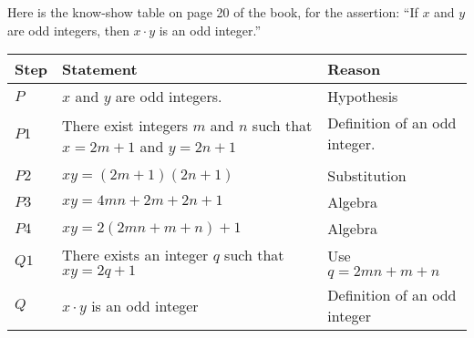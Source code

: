 \documentclass[12pt]{article}
\begin{document}
Here is the know-show table on page 20 of the book, for the assertion:
``If $x$ and $y$ are odd integers, then $x\cdot y$ is an odd integer.''\medskip

\begin{tabular}{|l|l|l|}\hline   %
  {\bf Step } & {\bf Statement} & {\bf Reason} \\ \hline    %
  $P$  & $x$ and $y$ are odd integers. & Hypothesis \\ \hline
  $P1$ & \multirow{2}{250pt}{There exist integers $m$ and $n$ such that $x=2m+1$ and $y=2n+1$} & Definition of an odd integer. \\
  & & \\ \hline     %
  $P2$& $xy=(2m+1)(2n+1)$& Substitution \\ \hline
  $P3$& $xy=4mn + 2m + 2n +1$ & Algebra \\ \hline
  $P4$& $xy=2(2mn +m+n)+1$ & Algebra \\ \hline
  $Q1$& There exists an integer $q$ such that $xy=2q+1$ & Use $q=2mn +m+n$ \\ \hline
  $Q$&  $x\cdot y$ is an odd integer & Definition of an odd integer \\ \hline
\end{tabular}   %
\end{document}
